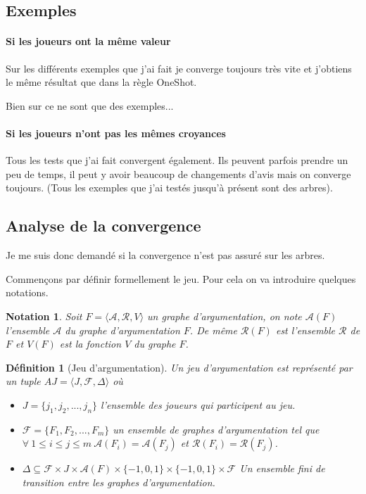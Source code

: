 \documentclass[12pt]{article}
\theoremstyle{defi}
\newtheorem{definition}{Définition}[section]
\theoremstyle{not}
\newtheorem{notation}{Notation}[section]
\theoremstyle{prob}
\begin{document}
  \subsection{Exemples}
    \paragraph{Si les joueurs ont la même valeur}
      Sur les différents exemples que j'ai fait je converge toujours très vite et j'obtiens le même résultat que dans la règle OneShot.

      Bien sur ce ne sont que des exemples...


    \paragraph{Si les joueurs n'ont pas les mêmes croyances}
      Tous les tests que j'ai fait convergent également. Ils peuvent parfois prendre un peu de temps, il peut y avoir beaucoup de changements d'avis mais on converge toujours.
      (Tous les exemples que j'ai testés jusqu'à présent sont des arbres).

  \subsection{Analyse de la convergence}
    Je me suis donc demandé si la convergence n'est pas assuré sur les arbres.

    Commençons par définir formellement le jeu.
    Pour cela on va introduire quelques notations.
    \begin{notation}
      Soit $F = \langle \mathcal{A}, \mathcal{R}, V \rangle$ un graphe d'argumentation, on note $\mathcal{A}(F)$ l'ensemble $\mathcal{A}$ du graphe d'argumentation $F$. De même $\mathcal{R}(F)$ est l'ensemble $\mathcal{R}$ de $F$ et $V(F)$ est la fonction $V$ du graphe $F$.

    \end{notation}
    \begin{definition}[Jeu d'argumentation]
      Un jeu d'argumentation est représenté par un tuple $AJ=\langle J, \mathcal{F}, \Delta \rangle$ où
      \begin{itemize}
        \item $J = \{j_1, j_2, ..., j_n\}$ l'ensemble des joueurs qui participent au jeu.
        \item $\mathcal{F} = \{F_1, F_2, ..., F_m\}$ un ensemble de graphes d'argumentation tel que $\forall\ 1 \leq i \leq j \leq m\ \mathcal{A}(F_i) = \mathcal{A}(F_j)$ et $\mathcal{R}(F_i) = \mathcal{R}(F_j)$.
        \item $\Delta \subseteq \mathcal{F} \times J \times \mathcal{A}(F) \times \{-1, 0, 1\} \times \{-1, 0, 1\} \times \mathcal{F}$ Un ensemble fini de transition entre les graphes d'argumentation.
      \end{itemize}
    \end{definition}
\end{document}
